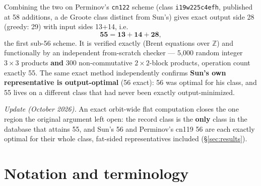\documentclass[10pt]{article}
\begin{document}
Combining the two on Perminov's \texttt{cn122} scheme (class
\texttt{i19w225c4efh}, published at 58 additions, a de Groote class
distinct from Sun's) gives exact output side 28 (greedy: 29) with input
sides 13+14, i.e.
\[
  \mathbf{55 = 13 + 14 + 28,}
\]
the first sub-56 scheme. It is verified exactly (Brent equations over
$\mathbb{Z}$) and functionally by an independent from-scratch checker
--- 5{,}000 random integer $3\times3$ products \textbf{and} 300
non-commutative $2\times2$-block products, operation count exactly 55.
The same exact method independently confirms \textbf{Sun's own
representative is output-optimal} (56 exact): 56 was optimal for his
class, and 55 lives on a different class that had never been exactly
output-minimized.

\emph{Update (October 2026).} An exact orbit-wide flat computation
closes the one region the original argument left open: the record
class is the \textbf{only} class in the database that attains 55, and
Sun's 56 and Perminov's cn119 56 are each exactly optimal for their
whole class, fat-sided representatives included (\S\ref{sec:results}).

\section{Notation and terminology}\label{sec:notation}
\end{document}

